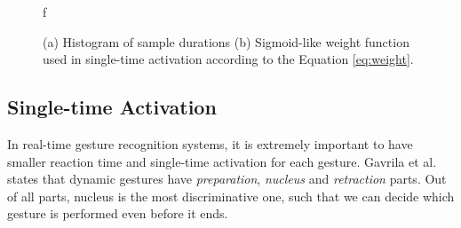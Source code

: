 \begin{figure}[b!]%
\centering
{}%
\label{fig:egoframe}%
\qquad
{}%
\caption{(a) Histogram of sample durations (b) Sigmoid-like weight function used in single-time activation according to the Equation \eqref{eq:weight}.}f
\label{fig:sigmoid}
\end{figure}


\subsection{Single-time Activation}
\label{subsec:sta}
In real-time gesture recognition systems, it is extremely important to have smaller reaction time and single-time activation for each gesture. Gavrila et al.\cite{Gavrila1999TheVA} states that dynamic gestures have \textit{preparation}, \textit{nucleus} and \textit{retraction} parts. Out of all parts, nucleus is the most discriminative one, such that we can decide which gesture is performed even before it ends.  \\

